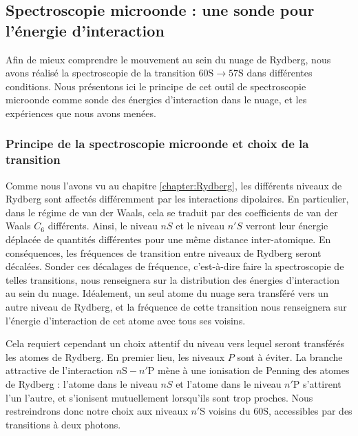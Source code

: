 	\subsection{Spectroscopie microonde : une sonde pour l'énergie d'interaction} \label{subsec:mw_spectro_exp}
\noindent Afin de mieux comprendre le mouvement au sein du nuage de Rydberg, nous avons réalisé la spectroscopie de la transition $\mathrm{60S} \rightarrow \mathrm{57S}$ dans différentes conditions.
Nous présentons ici le principe de cet outil de spectroscopie microonde comme sonde des énergies d'interaction dans le nuage, et les expériences que nous avons menées.

	\subsubsection*{Principe de la spectroscopie microonde et choix de la transition}
\noindent Comme nous l'avons vu au chapitre \ref{chapter:Rydberg}, les différents niveaux de Rydberg sont affectés différemment par les interactions dipolaires.
En particulier, dans le régime de van der Waals, cela se traduit par des coefficients de van der Waals $C_6$ différents.
Ainsi, le niveau $nS$ et le niveau $n'S$ verront leur énergie déplacée de quantités différentes pour une même distance inter-atomique.
En conséquences, les fréquences de transition entre niveaux de Rydberg seront décalées.
Sonder ces décalages de fréquence, c'est-à-dire faire la spectroscopie de telles transitions, nous renseignera sur la distribution des énergies d'interaction au sein du nuage.
Idéalement, un seul atome du nuage sera transféré vers un autre niveau de Rydberg, et la fréquence de cette transition nous renseignera sur l'énergie d'interaction de cet atome avec tous ses voisins.

Cela requiert cependant un choix attentif du niveau vers lequel seront transférés les atomes de Rydberg.
En premier lieu, les niveaux $P$ sont à éviter.
La branche attractive de l'interaction $n\mathrm{S} - n'\mathrm{P}$ mène à une ionisation de Penning des atomes de Rydberg : l'atome dans le niveau $nS$ et l'atome dans le niveau $n'\mathrm{P}$ s'attirent l'un l'autre, et s'ionisent mutuellement lorsqu'ils sont trop proches.
Nous restreindrons donc notre choix aux niveaux $n'\mathrm{S}$ voisins du $\mathrm{60S}$, accessibles par des transitions à deux photons.

